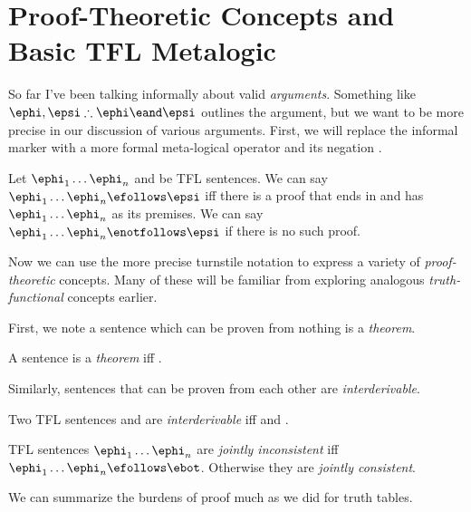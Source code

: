\section{Proof-Theoretic Concepts and Basic TFL Metalogic}

So far I've been talking informally about valid \emph{arguments}. Something
like $\ephi,\epsi\therefore\ephi\eand\epsi$ outlines the argument, but we
want to be more precise in our discussion of various arguments. First, we
will replace the informal \therefore marker with a more formal meta-logical
operator \efollows and its negation \enotfollows.

\begin{definition}[Turnstiles]
  \label{def:turnstiles}
  Let $\ephi_1\dots\ephi_n$ and \epsi be TFL sentences. We can say
  $\ephi_1\dots\ephi_n\efollows\epsi$ iff there is a proof that ends in \epsi
  and has $\ephi_1\dots\ephi_n$ as its premises. We can say
  $\ephi_1\dots\ephi_n\enotfollows\epsi$ if there is no such proof.
\end{definition}

Now we can use the more precise turnstile notation to express a variety of
\emph{proof-theoretic} concepts. Many of these will be familiar from exploring
analogous \emph{truth-functional} concepts earlier.

First, we note a sentence which can be proven from nothing is a \emph{theorem}.

\begin{definition}[Theorem]
  \label{def:theorem}
  A sentence \ephi is a \emph{theorem} iff \efollows\ephi.
\end{definition}

Similarly, sentences that can be proven from each other are
\emph{interderivable}.

\begin{definition}[Interderivable]
  \label{def:interderivable}
  Two TFL sentences \ephi and \epsi are \emph{interderivable} iff
  \ephi\efollows\epsi and \epsi\efollows\ephi.
\end{definition}

\begin{definition}
  \label{def:joint-consistency}
  TFL sentences $\ephi_1\dots\ephi_n$ are \emph{jointly inconsistent} iff
  $\ephi_1\dots\ephi_n\efollows\ebot$. Otherwise they are \emph{jointly
  consistent}.
\end{definition}

We can summarize the burdens of proof much as we did for truth tables.


